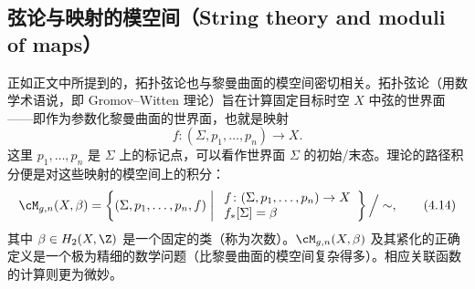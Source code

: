 
\subsection{弦论与映射的模空间（String theory and moduli of maps）}

正如正文中所提到的，拓扑弦论也与黎曼曲面的模空间密切相关。拓扑弦论（用数学术语说，即 Gromov--Witten 理论）旨在计算固定目标时空 $X$ 中弦的世界面——即作为参数化黎曼曲面的世界面，也就是映射
\begin{equation}
  f\colon(\Sigma,p_1,\dots,p_n)\longrightarrow X.
  \tag{4.13}
\end{equation}
这里 $p_1,\dots,p_n$ 是 $\Sigma$ 上的标记点，可以看作世界面 $\Sigma$ 的初始/末态。理论的路径积分便是对这些映射的模空间上的积分：
\begin{equation}
  \cM_{g,n}(X,\beta)=\left\{(\Sigma,p_1,\dots,p_n,f)\;\middle|\;
  \begin{array}{l}
    f\colon(\Sigma,p_1,\dots,p_n)\to X\\
    f_*[\Sigma]=\beta
  \end{array}
  \right\}\Big/\sim,
  \tag{4.14}
\end{equation}
其中 $\beta\in H_2(X,\Z)$ 是一个固定的类（称为次数）。$\cM_{g,n}(X,\beta)$ 及其紧化的正确定义是一个极为精细的数学问题（比黎曼曲面的模空间复杂得多）。相应关联函数的计算则更为微妙。

